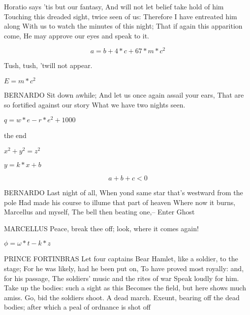\documentclass[a5paper,8pt]{article}
\begin{document}
Horatio says 'tis but our fantasy,
And will not let belief take hold of him
Touching this dreaded sight, twice seen of us:
Therefore I have entreated him along
With us to watch the minutes of this night;
That if again this apparition come,
He may approve our eyes and speak to it.

\begin{equation}
    a = b + 4*c + 67*m*c^2
\end{equation}

Tush, tush, 'twill not appear.

$E = m*c^2$

BERNARDO
Sit down awhile;
And let us once again assail your ears,
That are so fortified against our story
What we have two nights seen.

$q = w * e - r * e ^ 2 + 1000$

the end

$
    x^2 + y^2 = z^2
$

$y = k*x + b$

\begin{equation}
    a + b + c < 0
\end{equation}

BERNARDO
Last night of all,
When yond same star that's westward from the pole
Had made his course to illume that part of heaven
Where now it burns, Marcellus and myself,
The bell then beating one,--
Enter Ghost

MARCELLUS
Peace, break thee off; look, where it comes again!

$ 
\phi = \omega*t - k*z
$

PRINCE FORTINBRAS
Let four captains
Bear Hamlet, like a soldier, to the stage;
For he was likely, had he been put on,
To have proved most royally: and, for his passage,
The soldiers' music and the rites of war
Speak loudly for him.
Take up the bodies: such a sight as this
Becomes the field, but here shows much amiss.
Go, bid the soldiers shoot.
A dead march. Exeunt, bearing off the dead bodies; after which a peal of ordnance is shot off
\end{document}
